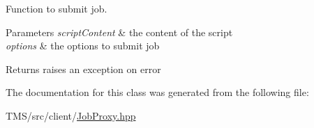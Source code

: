 Function to submit job. 


\begin{DoxyParams}{Parameters}
{\em scriptContent} & the content of the script \\
\hline
{\em options} & the options to submit job \\
\hline
\end{DoxyParams}
\begin{DoxyReturn}{Returns}
raises an exception on error 
\end{DoxyReturn}


The documentation for this class was generated from the following file:\begin{DoxyCompactItemize}
\item 
TMS/src/client/\hyperlink{JobProxy_8hpp}{JobProxy.hpp}\end{DoxyCompactItemize}
